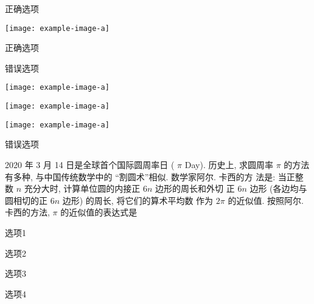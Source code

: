 \begin{xchoices}[]
  \item* 正确选项
  \item  \texttt{[image: example-image-a]}
  \item* 正确选项
  \item  错误选项
  \item  \texttt{[image: example-image-a]}
  \item  \texttt{[image: example-image-a]}
  \item  \texttt{[image: example-image-a]}
  \item  错误选项
\end{xchoices}
2020 年 3 月 14 日是全球首个国际圆周率日 ( $\pi$ Day). 历史上, 求圆周率 $\pi$ 的方法有多种, 与中国传统数学中的 “割圆术”相似. 数学家阿尔. 卡西的方 法是: 当正整数 $n$ 充分大时, 计算单位圆的内接正 $6 n$ 边形的周长和外切 正 $6 n$ 边形 (各边均与圆相切的正 $6 n$ 边形) 的周长, 将它们的算术平均数 作为 $2 \pi$ 的近似值. 按照阿尔. 卡西的方法, $\pi$ 的近似值的表达式是 \xparen
\begin{xchoices}[items = 2, label-pos = left]
  \item 选项1
  \item 选项2
  \item 选项3
  \item 选项4
\end{xchoices}

